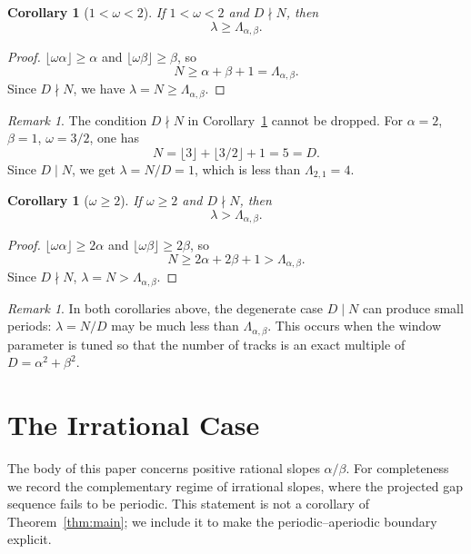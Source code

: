 \documentclass[11pt,reqno]{amsart}
\theoremstyle{plain}
\newtheorem{corollary}[theorem]{Corollary}
\theoremstyle{definition}
\theoremstyle{remark}
\newtheorem{remark}[theorem]{Remark}
\begin{document}
\begin{corollary}[\(1 < \omega < 2\)]\label{cor:medium_omega}
If \(1 < \omega < 2\) and \(D \nmid N\), then
\[
    \lambda \ge \Lambda_{\alpha,\beta}.
\]
\end{corollary}

\begin{proof}
\(\lfloor\omega\alpha\rfloor \ge \alpha\) and
\(\lfloor\omega\beta\rfloor \ge \beta\), so
\[
    N \ge \alpha + \beta + 1 = \Lambda_{\alpha,\beta}.
\]
Since \(D \nmid N\), we have \(\lambda = N \ge \Lambda_{\alpha,\beta}\).
\end{proof}

\begin{remark}
The condition \(D \nmid N\) in Corollary~\ref{cor:medium_omega} cannot be
dropped.  For \(\alpha = 2\), \(\beta = 1\), \(\omega = 3/2\), one has
\[
    N = \lfloor 3 \rfloor + \lfloor 3/2 \rfloor + 1 = 5 = D.
\]
Since \(D \mid N\), we get \(\lambda = N/D = 1\), which is less than
\(\Lambda_{2,1} = 4\).
\end{remark}

\begin{corollary}[\(\omega \ge 2\)]\label{cor:large_omega}
If \(\omega \ge 2\) and \(D \nmid N\), then
\[
    \lambda > \Lambda_{\alpha,\beta}.
\]
\end{corollary}

\begin{proof}
\(\lfloor\omega\alpha\rfloor \ge 2\alpha\) and
\(\lfloor\omega\beta\rfloor \ge 2\beta\), so
\[
    N \ge 2\alpha + 2\beta + 1 > \Lambda_{\alpha,\beta}.
\]
Since \(D \nmid N\), \(\lambda = N > \Lambda_{\alpha,\beta}\).
\end{proof}

\begin{remark}
In both corollaries above, the degenerate case \(D \mid N\) can produce
small periods: \(\lambda = N/D\) may be much less than
\(\Lambda_{\alpha,\beta}\).  This occurs when the window parameter is tuned so
that the number of tracks is an exact multiple of \(D = \alpha^2+\beta^2\).
\end{remark}

\section{The Irrational Case}\label{sec:irrational}

The body of this paper concerns positive rational slopes \(\alpha/\beta\).
For completeness we record the complementary regime of irrational slopes,
where the projected gap sequence fails to be periodic.  This statement is
not a corollary of Theorem~\ref{thm:main}; we include it to make the
periodic--aperiodic boundary explicit.
\end{document}
